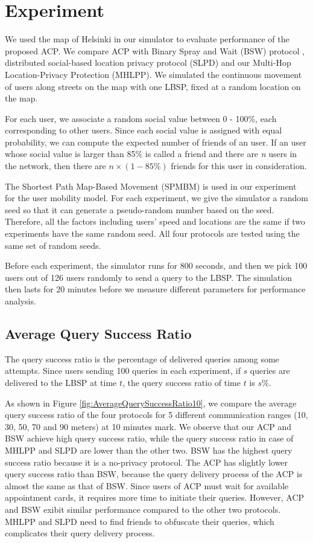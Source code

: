 
\section{ Experiment}

\noindent We used the map of Helsinki in our simulator to evaluate performance of the proposed ACP. We compare ACP with Binary Spray and Wait (BSW) protocol \cite{C31}, distributed social-based location privacy protocol (SLPD) \cite{C16} and our Multi-Hop Location-Privacy Protection (MHLPP). We simulated the continuous movement of users along streets on the map with one LBSP, fixed at a random location on the map.

For each user, we associate a random social value between 0 - 100\%, each corresponding to other users. Since each social value is assigned with equal probability, we can compute the expected number of friends of an user. If an user whose social value is larger than 85\% is called a friend and there are \textit{n} users in the network, then there are $n\times \left(1-85\%\right)$ friends for this user in consideration.

The Shortest Path Map-Based Movement (SPMBM) \cite{C35} is used in our experiment for the user mobility model. For each experiment, we give the simulator a random seed so that it can generate a pseudo-random number based on the seed. Therefore, all the factors including users' speed and locations are the same if two experiments have the same random seed. All four protocols are tested using the same set of random seeds.

Before each experiment, the simulator runs for 800 seconds, and then we pick 100 users out of 126 users randomly to send a query to the LBSP. The simulation then lasts for 20 minutes before we measure different parameters for performance analysis. 


\subsection{ Average Query Success Ratio}

\noindent The query success ratio is the percentage of delivered queries among some attempts. Since users sending 100 queries in each experiment, if $s$ queries are delivered to the LBSP at time $t$, the query success ratio of time $t$ is $s\%$.

As shown in Figure \ref{fig:AverageQuerySuccessRatio10}, we compare the average query success ratio of the four protocols for 5 different communication ranges (10, 30, 50, 70 and 90 meters) at 10 minutes mark. We observe that our ACP and BSW achieve high query success ratio, while the query success ratio in case of MHLPP and SLPD are lower than the other two. BSW has the highest query success ratio because it is a no-privacy protocol. The ACP has slightly lower query success ratio than BSW, because the query delivery process of the ACP is almost the same as that of BSW. Since users of ACP must wait for available appointment cards, it requires more time to initiate their queries. However, ACP and BSW exibit similar performance compared to the other two protocols. MHLPP and SLPD need to find friends to obfuscate their queries, which complicates their query delivery process.

